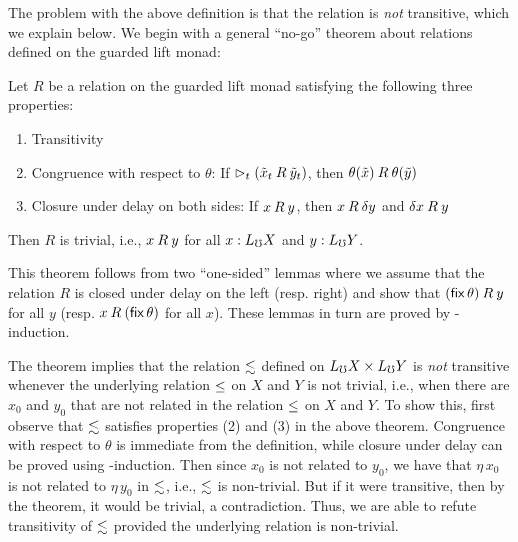 The problem with the above definition is that the relation is \emph{not}
transitive, which we explain below. We begin with a general ``no-go'' theorem
about relations defined on the guarded lift monad:

\begin{theorem}\label{thm:no-go}
    Let $R$ be a relation on the guarded lift monad satisfying the following
    three properties:
    \begin{enumerate}
        \item Transitivity
        
        \item Congruence with respect to $\theta$: If $\vartriangleright_t (\tilde{x}_t
        \mathbin{R} \tilde{y}_t)$, then $\theta(\tilde{x}) \mathbin{R}
        \theta(\tilde{y})$

        \item Closure under delay on both sides: If $x \mathbin{R} y$, then $x
        \mathbin{R} \delta y$ and $\delta x  \mathbin{R} y$
    \end{enumerate}

    Then $R$ is trivial, i.e., $x \mathbin{R} y$ for all $x : L_\mho X$ and $y : L_\mho
    Y$.
    
\end{theorem}

This theorem follows from two ``one-sided'' lemmas where we assume that the
relation $R$ is closed under delay on the left (resp. right) and show that
$(\mathsf{fix}\, \theta) \mathbin{R} y$ for all $y$ (resp. $x \mathbin{R} (\mathsf{fix}\, \theta)$
for all $x$). These lemmas in turn are proved by \lob-induction.

The theorem implies that the relation $\lesssim$ defined on $L_\mho X \times L_\mho
Y$ is \emph{not} transitive whenever the underlying relation $\le$ on $X$ and
$Y$ is not trivial, i.e., when there are $x_0$ and $y_0$ that are not related in
the relation $\le$ on $X$ and $Y$. To show this, first observe that
$\lesssim$ satisfies properties (2) and (3) in the above theorem. Congruence
with respect to $\theta$ is immediate from the definition, while closure under
delay can be proved using \lob-induction.
Then since $x_0$ is not related to $y_0$, we have that $\eta\, x_0$ is not
related to $\eta\, y_0$ in $\lesssim$, i.e., $\lesssim$ is non-trivial. But if
it were transitive, then by the theorem, it would be trivial, a contradiction.
Thus, we are able to refute transitivity of $\lesssim$ provided the underlying
relation is non-trivial.

